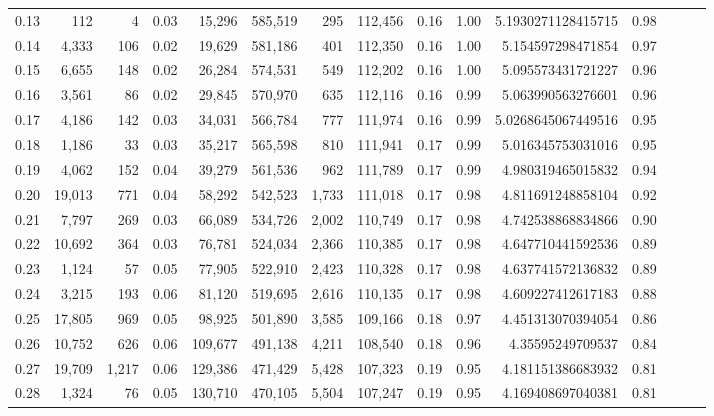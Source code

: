 \begin{tabular}{rrrrrrrrrrrrrrr}
0.13 &     112 &      4 &  0.03 &   15,296 &  585,519 &      295 &  112,456 &  0.16 &  1.00 &      5.1930271128415715 &      0.98 \\
0.14 &   4,333 &    106 &  0.02 &   19,629 &  581,186 &      401 &  112,350 &  0.16 &  1.00 &       5.154597298471854 &      0.97 \\
0.15 &   6,655 &    148 &  0.02 &   26,284 &  574,531 &      549 &  112,202 &  0.16 &  1.00 &       5.095573431721227 &      0.96 \\
0.16 &   3,561 &     86 &  0.02 &   29,845 &  570,970 &      635 &  112,116 &  0.16 &  0.99 &       5.063990563276601 &      0.96 \\
0.17 &   4,186 &    142 &  0.03 &   34,031 &  566,784 &      777 &  111,974 &  0.16 &  0.99 &      5.0268645067449516 &      0.95 \\
0.18 &   1,186 &     33 &  0.03 &   35,217 &  565,598 &      810 &  111,941 &  0.17 &  0.99 &       5.016345753031016 &      0.95 \\
0.19 &   4,062 &    152 &  0.04 &   39,279 &  561,536 &      962 &  111,789 &  0.17 &  0.99 &       4.980319465015832 &      0.94 \\
0.20 &  19,013 &    771 &  0.04 &   58,292 &  542,523 &    1,733 &  111,018 &  0.17 &  0.98 &       4.811691248858104 &      0.92 \\
0.21 &   7,797 &    269 &  0.03 &   66,089 &  534,726 &    2,002 &  110,749 &  0.17 &  0.98 &       4.742538868834866 &      0.90 \\
0.22 &  10,692 &    364 &  0.03 &   76,781 &  524,034 &    2,366 &  110,385 &  0.17 &  0.98 &       4.647710441592536 &      0.89 \\
0.23 &   1,124 &     57 &  0.05 &   77,905 &  522,910 &    2,423 &  110,328 &  0.17 &  0.98 &       4.637741572136832 &      0.89 \\
0.24 &   3,215 &    193 &  0.06 &   81,120 &  519,695 &    2,616 &  110,135 &  0.17 &  0.98 &       4.609227412617183 &      0.88 \\
0.25 &  17,805 &    969 &  0.05 &   98,925 &  501,890 &    3,585 &  109,166 &  0.18 &  0.97 &       4.451313070394054 &      0.86 \\
0.26 &  10,752 &    626 &  0.06 &  109,677 &  491,138 &    4,211 &  108,540 &  0.18 &  0.96 &        4.35595249709537 &      0.84 \\
0.27 &  19,709 &  1,217 &  0.06 &  129,386 &  471,429 &    5,428 &  107,323 &  0.19 &  0.95 &       4.181151386683932 &      0.81 \\
0.28 &   1,324 &     76 &  0.05 &  130,710 &  470,105 &    5,504 &  107,247 &  0.19 &  0.95 &       4.169408697040381 &      0.81 \\

\end{tabular}
